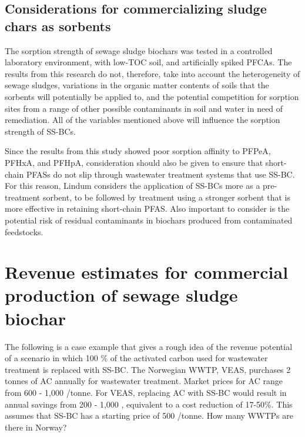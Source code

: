 \subsection{Considerations for commercializing sludge chars as sorbents}
The sorption strength of sewage sludge biochars was tested in a controlled laboratory environment, with low-TOC soil, and artificially spiked PFCAs. The results from this research do not, therefore, take into account the heterogeneity of sewage sludges, variations in the organic matter contents of soils that the sorbents will potentially be applied to, and the potential competition for sorption sites from a range of other possible contaminants in soil and water in need of remediation. All of the variables mentioned above will influence the sorption strength of SS-BCs. 

Since the results from this study showed poor sorption affinity to PFPeA, PFHxA, and PFHpA, consideration should also be given to ensure that short-chain PFASs do not slip through wastewater treatment systems that use SS-BC. For this reason, Lindum considers the application of SS-BCs more as a pre-treatment sorbent, to be followed by treatment using a stronger sorbent that is more effective in retaining short-chain PFAS. Also important to consider is the potential risk of residual contaminants in biochars produced from contaminated feedstocks. 


\section{Revenue estimates for commercial production of sewage sludge biochar}
The following is a case example that gives a rough idea of the revenue potential of a scenario in which 100 \% of the activated carbon used for wastewater treatment is replaced with SS-BC. The Norwegian WWTP, VEAS, purchases 2 tonnes of AC annually for wastewater treatment. Market prices for AC range from 600 - 1,000 \texteuro/tonne. For VEAS, replacing AC with SS-BC would result in annual savings from 200 - 1,000 \texteuro, equivalent to a cost reduction of 17-50\%. This assumes that SS-BC has a starting price of 500 \texteuro/tonne. How many WWTPs are there in Norway?

